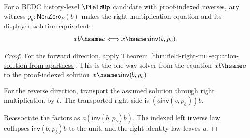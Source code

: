 \begin{theorem}
\label{thm:field-right-mul-equation-exact-from-apartness}
For a BEDC history-level $\FieldUp$ candidate with proof-indexed inverses,
any witness $p_b:\mathsf{NonZero}_F(b)$ makes the right-multiplication
equation and its displayed solution equivalent:
$$
x b\hsame a
\Longleftrightarrow
x\hsame a\mathsf{inv}(b,p_b).
$$
\end{theorem}
\begin{proof}
For the forward direction, apply
Theorem~\ref{thm:field-right-mul-equation-solution-from-apartness}. This is
the one-way solver from the equation $x b\hsame a$ to the proof-indexed
solution $x\hsame a\mathsf{inv}(b,p_b)$.

For the reverse direction, transport the assumed solution through right
multiplication by $b$. The transported right side is
$(a\mathsf{inv}(b,p_b))b$.

Reassociate the factors as $a(\mathsf{inv}(b,p_b)b)$. The indexed left
inverse law collapses $\mathsf{inv}(b,p_b)b$ to the unit, and the right
identity law leaves $a$.
\end{proof}
